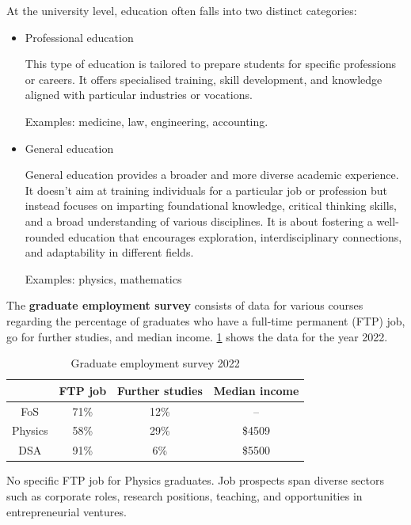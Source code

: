 \documentclass[12pt,a4paper]{article}
\begin{document}
At the university level, education often falls into two distinct categories:
\begin{itemize}
\item Professional education

This type of education is tailored to prepare students for specific professions or careers. It offers specialised training, skill development, and knowledge aligned with particular industries or vocations. 

Examples: medicine, law, engineering, accounting.

\item General education

General education provides a broader and more diverse academic experience. It doesn't aim at training individuals for a particular job or profession but instead focuses on imparting foundational knowledge, critical thinking skills, and a broad understanding of various disciplines. It is about fostering a well-rounded education that encourages exploration, interdisciplinary connections, and adaptability in different fields.

Examples: physics, mathematics
\end{itemize}

The \textbf{graduate employment survey} consists of data for various courses regarding the percentage of graduates who have a full-time permanent (FTP) job, go for further studies, and median income. \cref{table:survey} shows the data for the year 2022.
\begin{table}[H]
\centering
\begin{tabular}{cccc}
\hline\hline
& FTP job & Further studies & Median income \\
\hline
FoS & 71\% & 12\% & -- \\
Physics & 58\% & 29\% & \$4509 \\
DSA & 91\% & 6\% & \$5500 \\
\hline\hline
\end{tabular}
\caption{Graduate employment survey 2022}
\label{table:survey}
\end{table}

No specific FTP job for Physics graduates. Job prospects span diverse sectors such as corporate roles, research positions, teaching, and opportunities in entrepreneurial ventures.
\end{document}
